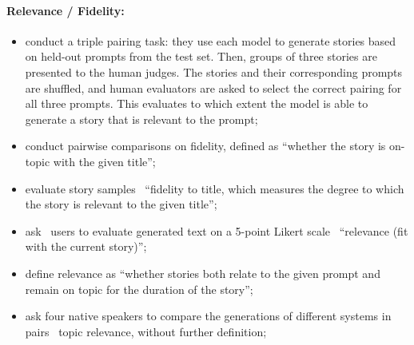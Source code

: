 \paragraph{Relevance / Fidelity:}
\begin{itemize}[nolistsep]
    \item \citet{fan2018hierarchical} conduct a triple pairing task: they use each model to generate stories based on held-out prompts from the test set. Then, groups of three stories are presented to the human judges. The stories and their corresponding prompts are shuffled, and human evaluators are asked to select the correct pairing for all three prompts. This evaluates to which extent the model is able to generate a story that is relevant to the prompt;
    \item \citet{yao2019plan} conduct pairwise comparisons on fidelity, defined as ``whether the story is on-topic with the given title'';
    \item \citet{jhamtani-berg-kirkpatrick-2020-narrative} evaluate story samples \wrt\ ``fidelity to title, which measures the degree to which the story is relevant to the given title'';
    \item \citet{akoury2020storium} ask \storium\ users to evaluate generated text on a 5-point Likert scale \wrt\ ``relevance (fit with the current story)'';
    \item \citet{goldfarb-tarrant-etal-2020-content} define relevance as ``whether stories both relate to the given prompt and remain on topic for the duration of the story'';
    \item \citet{bai2021semantics} ask four native speakers to compare the generations of different systems in pairs \wrt\ topic relevance, without further definition;
\end{itemize}

